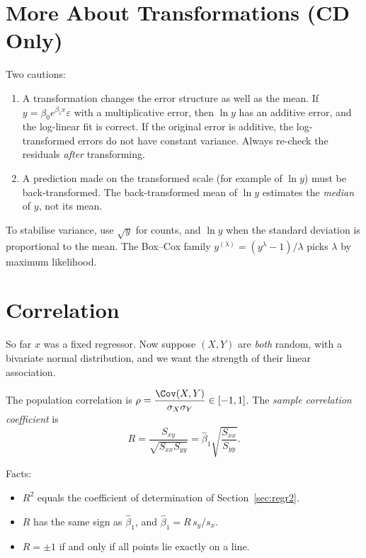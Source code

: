 \section{More About Transformations (CD Only)}

Two cautions:
\begin{enumerate}
  \item A transformation changes the error structure as well as the mean. If $y=\beta_0e^{\beta_1x}\varepsilon$ with a multiplicative error, then $\ln y$ has an additive error, and the log-linear fit is correct. If the original error is additive, the log-transformed errors do not have constant variance. Always re-check the residuals \emph{after} transforming.
  \item A prediction made on the transformed scale (for example of $\ln y$) must be back-transformed. The back-transformed mean of $\ln y$ estimates the \emph{median} of $y$, not its mean.
\end{enumerate}
To stabilise variance, use $\sqrt y$ for counts, and $\ln y$ when the standard deviation is proportional to the mean. The Box--Cox family $y^{(\lambda)}=(y^\lambda-1)/\lambda$ picks $\lambda$ by maximum likelihood.

\section{Correlation}

So far $x$ was a fixed regressor. Now suppose $(X,Y)$ are \emph{both} random, with a bivariate normal distribution, and we want the strength of their linear association.

\begin{definition}
The population correlation is $\rho=\dfrac{\Cov(X,Y)}{\sigma_X\sigma_Y}\in[-1,1]$. The \emph{sample correlation coefficient} is
\[ R=\frac{S_{xy}}{\sqrt{S_{xx}S_{yy}}}=\hat\beta_1\sqrt{\frac{S_{xx}}{S_{yy}}}. \]
\end{definition}

Facts:
\begin{itemize}
  \item $R^2$ equals the coefficient of determination of Section~\ref{sec:regr2}.
  \item $R$ has the same sign as $\hat\beta_1$, and $\hat\beta_1=R\,s_y/s_x$.
  \item $R=\pm1$ if and only if all points lie exactly on a line.
\end{itemize}

